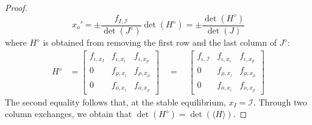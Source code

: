 \documentclass[10pt,a4paper]{amsart}
\begin{document}
\begin{proof}
\[
x_o'=\pm \frac{f_{I,\mathcal{I}}}{\det(J^\diamond)}\det(H^\diamond) = \pm \frac{\det(H^\diamond)}{\det(J)}
\]
where $H^\diamond$ is obtained from removing the first row and the last column of $J^\diamond$:
\begin{equation}
\begin{aligned}
H^\diamond &= \begin{bmatrix}
f_{\iota, x_{I}} & f_{\iota, x_{\iota}} & f_{\iota, x_{\rho}}\\
0 & f_{\rho, x_{\iota}} & f_{\rho, x_{\rho}}\\
0 & f_{o, x_{\iota}} & f_{o, x_{\rho}}
\end{bmatrix} 
\quad = \quad
\begin{bmatrix}
f_{\iota, \mathcal{I}} & f_{\iota, x_{\iota}} & f_{\iota, x_{\rho}}\\
0 & f_{\rho, x_{\iota}} & f_{\rho, x_{\rho}}\\
0 & f_{o, x_{\iota}} & f_{o, x_{\rho}}
\end{bmatrix}
\end{aligned}
\end{equation}
The second equality follows that, at the stable equilibrium, $x_I=\mathcal{I}$. 
Through two column exchanges, we obtain that $\det(H^\diamond) = \det(\langle H \rangle)$. 
\end{proof}
\end{document}
